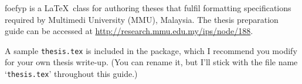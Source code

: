 \textsf{foefyp} is a \LaTeX\ class for authoring theses that fulfil formatting specifications required by Multimedi University (MMU), Malaysia. The thesis preparation guide can be accessed at \url{http://research.mmu.edu.my/ips/node/188}.

A sample \texttt{thesis.tex} is included in the package, which I recommend you modify for your own thesis write-up. (You can rename it, but I'll stick with the file name `\texttt{thesis.tex}' throughout this guide.)
